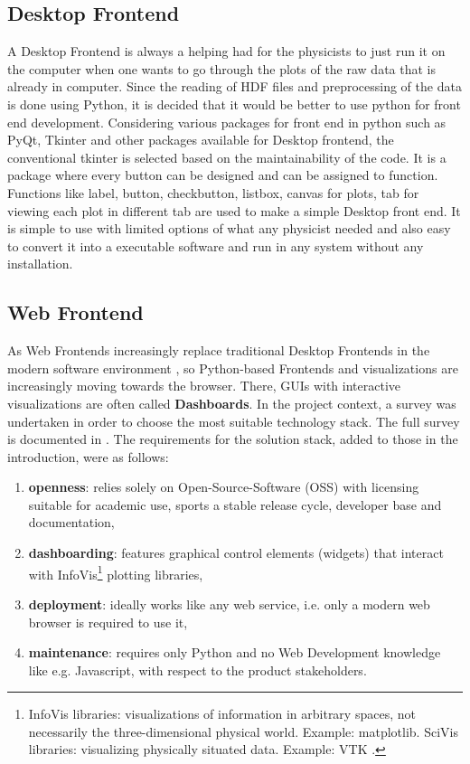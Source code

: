 \subsection{Desktop Frontend}
\label{sec:desktop-frontend}

A Desktop Frontend is always a helping had for the physicists to just run it on the computer when one wants to go through the plots of the raw data that is already in computer. 
Since the reading of HDF files and preprocessing of the data is done using Python, it is decided that it would be better to use python for front end development. Considering various packages for front end in python such as PyQt, Tkinter and other packages available for Desktop frontend, the conventional tkinter is selected based on the maintainability of the code. It is a package where every button can be designed and can be assigned to function.
Functions like label, button, checkbutton, listbox, canvas for plots, tab for viewing each plot in different tab are used to make a simple Desktop front end. It is simple to use with limited options of what any physicist needed and also easy to convert it into a executable software and run in any system without any installation.

\subsection{Web Frontend}
\label{sec:web-frontend}

As Web Frontends increasingly replace traditional Desktop Frontends in the
modern software environment \cite{web-vs-desktop}, so Python-based Frontends and
visualizations are increasingly moving towards the browser. There, GUIs with
interactive visualizations are often called \textbf{Dashboards}. In the project
context, a survey was undertaken in order to choose the most suitable technology
stack. The full survey is documented in \cite{jw-notes}. The requirements for
the solution stack, added to those in the introduction, were as follows:

\begin{enumerate}
\item \textbf{openness}: relies solely on Open-Source-Software (OSS) with
    licensing suitable for academic use, sports a stable release cycle, developer
    base and documentation,
\item \textbf{dashboarding}: features graphical control elements (widgets) that
    interact with InfoVis\footnote{InfoVis libraries: visualizations of
      information in arbitrary spaces, not necessarily the three-dimensional
      physical world. Example: matplotlib. SciVis libraries: visualizing
      physically situated data. Example: VTK \cite{python-viz-2018}.} plotting
    libraries,
\item \textbf{deployment}: ideally works like any web service, i.e. only a
    modern web browser is required to use it,
\item \textbf{maintenance}: requires only Python and no Web Development
    knowledge like e.g. Javascript, with respect to the product stakeholders.
\end{enumerate}

